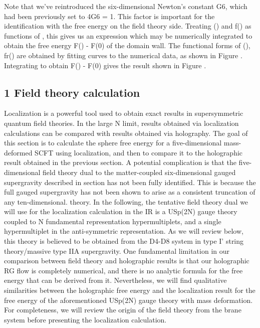 \documentclass{article}
\begin{document}
\sloppy

Note that we've reintroduced the six-dimensional Newton's constant G6, which had been
previously set to 4G6 = 1. This factor is important for the identification with the free
energy on the field theory side. Treating () and f() as functions of , this gives us an
expression which may be numerically integrated to obtain the free energy F() - F(0) of
the domain wall. The functional forms of (), fr() are obtained by fitting curves to the
numerical data, as shown in Figure . Integrating to obtain F() - F(0) gives the result
shown in Figure .


\subsection*{1 Field theory calculation}


Localization is a powerful tool used to obtain exact results in supersymmetric quantum field
theories. In the large N limit, results obtained via localization calculations can be compared
with results obtained via holography. The goal of this section is to calculate the sphere free
energy for a five-dimensional mass-deformed SCFT using localization, and then to compare
it to the holographic result obtained in the previous section. A potential complication
is that the five-dimensional field theory dual to the matter-coupled six-dimensional gauged
supergravity described in section has not been fully identified. This is because the full gauged
supergravity has not been shown to arise as a consistent truncation of any ten-dimensional.
theory. In the following, the tentative field theory dual we will use for the localization
calculation in the IR is a USp(2N) gauge theory coupled to N fundamental representation
hypermultiplets, and a single hypermultiplet in the anti-symmetric representation. As we
will review below, this theory is believed to be obtained from the D4-D8 system in type I'
string theory/massive type IIA supergravity. One fundamental limitation in our comparison
between field theory and holographic results is that our holographic RG flow is completely
numerical, and there is no analytic formula for the free energy that can be derived from it.
Nevertheless, we will find qualitative similarities between the holographic free energy and
the localization result for the free energy of the aforementioned USp(2N) gauge theory with
mass deformation. For completeness, we will review the origin of the field theory from the
brane system before presenting the localization calculation.
\end{document}
